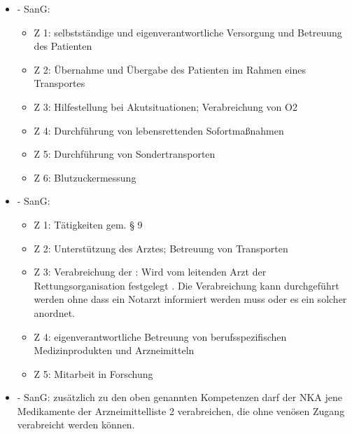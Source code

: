 \begin{itemize}
    \item {\mdseries
     -  SanG:}
    
    \begin{itemize}
        \item {\mdseries
        Z 1: selbstständige und eigenverantwortliche Versorgung und Betreuung
        des Patienten}
        
        \item {\mdseries
        Z 2: \"Ubernahme und \"Ubergabe des Patienten im Rahmen
        eines Transportes}
        
        \item {\mdseries
        Z 3: Hilfestellung bei Akutsituationen; Verabreichung von O2}
        
        \item {\mdseries
        Z 4: Durchf\"uhrung von lebensrettenden Sofortma{\ss}nahmen}
        
        \item {\mdseries
        Z 5: Durchf\"uhrung von Sondertransporten}
        
        \item {\mdseries
        Z 6: Blutzuckermessung}
        
    \end{itemize}
    
    \item {} -  SanG:
    
    \begin{itemize}
        \item Z 1: Tätigkeiten gem. {\S} 9
        \item Z 2: Unterst\"utzung des Arztes; Betreuung von Transporten
        \item
        Z 3: Verabreichung der :
        Wird vom leitenden Arzt der Rettungsorganisation
        festgelegt . Die Verabreichung kann
        durchgef\"uhrt werden ohne dass ein Notarzt informiert werden muss oder es
        ein solcher anordnet.
        \item Z 4: eigenverantwortliche Betreuung von berufsspezifischen
        Medizinprodukten und Arzneimitteln
        \item 	Z 5: Mitarbeit in Forschung
    \end{itemize}
    \item {} -  SanG:
    zusätzlich zu den oben genannten Kompetenzen darf der NKA jene
    Medikamente der Arzneimittelliste 2 verabreichen, die ohne ven\"osen
    Zugang verabreicht werden k\"onnen.
    

\end{itemize}
